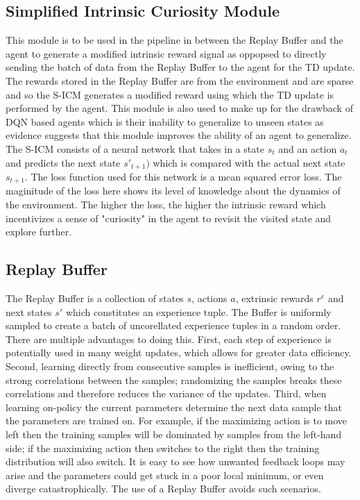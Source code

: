 \documentclass[12pt,a4paper]{article}
\begin{document}
\subsection{Simplified Intrinsic Curiosity Module}
This module is to be used in the pipeline in between the Replay Buffer and the agent to generate
a modified intrinsic reward signal as oppopsed to directly sending the batch of data from the Replay Buffer
to the agent for the TD update. The rewards stored in the Replay Buffer are from the environment and are sparse
and so the S-ICM generates a modified reward using which the TD update is performed by the agent.
This module is also used to make up for the drawback of DQN based agents which is their inability to generalize
to unseen states as evidence suggests that this module improves the ability of an agent to generalize.
The S-ICM consists of a neural network that takes in a state $s_t$ and an action $a_t$ and predicts the next state $s'_{t+1})$
which is compared with the actual next state $s_{t+1}$. The loss function used for this network is a 
mean squared error loss. The maginitude of the loss here shows its level
of knowledge about the dynamics of the environment. The higher the loss, the higher the intrinsic reward
which incentivizes a sense of "curiosity" in the agent to revisit the visited state and explore further.

\subsection{Replay Buffer}
The Replay Buffer is a collection of states $s$, actions $a$, extrinsic rewards $r^e$ and 
next states $s'$ which constitutes an experience tuple. The Buffer is uniformly sampled to 
create a batch of uncorellated experience tuples in a random order. There are multiple advantages
to doing this. First, each step of experience is potentially used in many weight 
updates, which allows for greater data efficiency. Second, learning directly from
consecutive samples is inefficient, owing to the strong correlations between the 
samples; randomizing the samples breaks these correlations and therefore reduces 
the variance of the updates. Third, when learning on-policy the current parameters 
determine the next data sample that the parameters are trained on. For example, if the
maximizing action is to move left then the training samples will be dominated by
samples from the left-hand side; if the maximizing action then switches to the 
right then the training distribution will also switch. 
It is easy to see how unwanted feedback loops may arise and the parameters could
get stuck in a poor local minimum, or even diverge catastrophically. The use of a Replay
Buffer avoids such scenarios.
\end{document}
